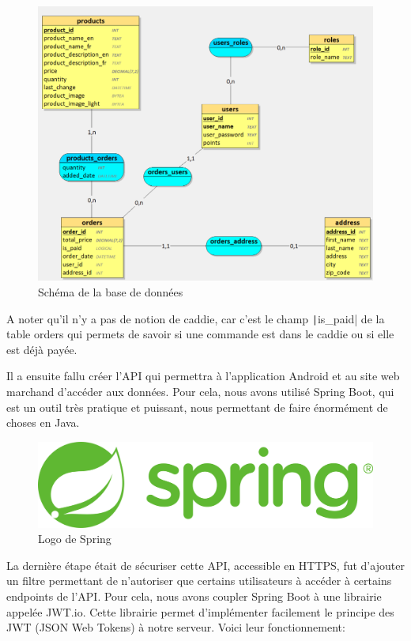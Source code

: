 \begin{figure}[H]
    \centering
    \includegraphics[width=\textwidth]{./img/joey-looping.png}
    \caption{Schéma de la base de données}
    \label{fig:poc-db-looping}
\end{figure}

A noter qu'il n'y a pas de notion de caddie, car c'est le champ \texttt|is_paid| de la table orders qui permets de savoir si une commande est dans le caddie ou si elle est déjà payée.

Il a ensuite fallu créer l'API qui permettra à l'application Android et au site web marchand d'accéder aux
données. Pour cela, nous avons utilisé Spring Boot, qui est un outil très pratique et puissant, nous
permettant de faire énormément de choses en Java.

\begin{figure}[H]
    \centering
    \includegraphics[scale=.2]{./img/joey-spring-framework.png}
    \caption{Logo de Spring}
    \label{fig:poc-spring-logo}
\end{figure}

La dernière étape était de sécuriser cette API, accessible en HTTPS, fut d'ajouter un filtre permettant de
n'autoriser que certains utilisateurs à accéder à certains endpoints de l'API. Pour cela, nous avons coupler
Spring Boot à une librairie appelée JWT.io. Cette librairie permet d'implémenter facilement le principe
des JWT (JSON Web Tokens) à notre serveur. Voici leur fonctionnement:

